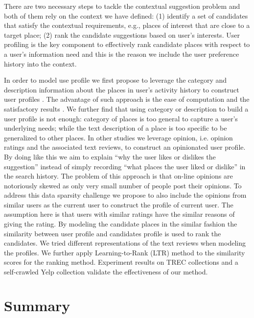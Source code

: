 There are two necessary steps to tackle the contextual suggestion problem 
and both of them rely on the context we have defined: 
(1) identify a set of candidates that satisfy the contextual 
requirements, e.g., places of interest that are close to a target place; 
(2) rank the candidate suggestions based on user's interests. 
User profiling is the key component to effectively rank candidate places 
with respect to a user's information need and this is the reason we include 
the user preference history into the context. 

In order to model use profile we first propose to leverage the 
category and description information about the places in user's activity 
history to construct user profiles \cite{udel:treccs2012}. 
The advantage of such approach is the ease of computation and the satisfactory 
results \cite{adriel:overview}. 
We further find that using category or description to build a user profile 
is not enough: category of places is too general to capture a user's 
underlying needs; while the text description of a place is too specific to 
be generalized to other places. 
In other studies \cite{udel:treccs2013,udel:treccs2014,udel:treccs2015,Yang:2013:OUP:2499178.2499191,Yang2015}
we leverage opinion, 
i.e. opinion ratings and the associated text reviews, to construct an 
opinionated user profile. By doing like this we aim to explain 
``why the user likes or dislikes the suggestion'' instead of simply recording 
``what places the user liked or dislike'' in the search history. 
The problem of this approach is that on-line opinions are notoriously skewed 
as only very small number of people post their opinions. 
To address this data sparsity challenge we propose to also include the 
opinions from similar users as the current user to construct the profile of 
current user. The assumption here is that users with similar ratings have 
the similar reasons of giving the rating. By modeling the candidate places 
in the similar fashion the similarity between user profile and candidates 
profile is used to rank the candidates. We tried different representations 
of the text reviews when modeling the profiles. We further apply 
Learning-to-Rank (LTR) method to the similarity scores for the ranking method. 
Experiment results on TREC collections and a self-crawled Yelp collection 
validate the effectiveness of our method.


\section{Summary}

